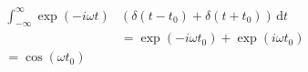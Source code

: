 \documentclass[10pt]{article}
\begin{document}
\begin{align*}\int_{-\infty}^{\infty}\exp(-i\omega t)&(\delta(t-t_0)+\delta(t+t_0))\,\mathrm{d}t \\
&= \exp(-i\omega t_0)+\exp(i\omega t_0) \\
= \cos(\omega t_0)\end{align*}
\end{document}
